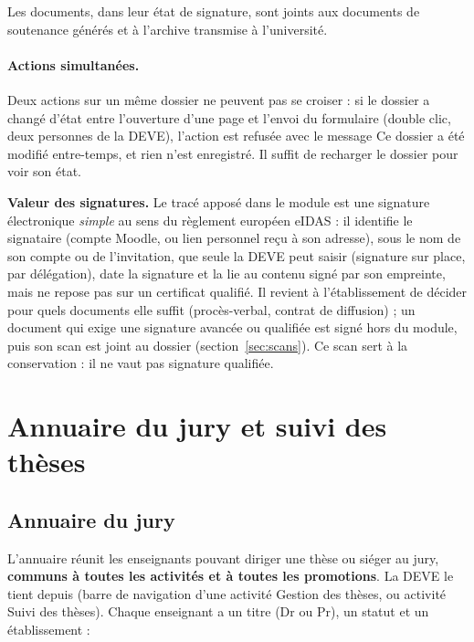 \documentclass[11pt,a4paper]{article}
\begin{document}

Les documents, dans leur état de signature, sont joints aux documents de
soutenance générés et à l'archive transmise à l'université.

\paragraph{Actions simultanées.} Deux actions sur un même dossier ne peuvent
pas se croiser : si le dossier a changé d'état entre l'ouverture d'une page et
l'envoi du formulaire (double clic, deux personnes de la DEVE), l'action est
refusée avec le message \og Ce dossier a été modifié entre-temps\fg{}, et
rien n'est enregistré. Il suffit de recharger le dossier pour voir son état.

\begin{attention}
\textbf{Valeur des signatures.} Le tracé apposé dans le module est une
signature électronique \emph{simple} au sens du règlement européen eIDAS : il
identifie le signataire (compte Moodle, ou lien personnel reçu à son adresse),
sous le nom de son compte ou de l'invitation, que seule la DEVE peut saisir
(signature sur place, par délégation),
date la signature et la lie au contenu signé par son empreinte, mais ne repose
pas sur un certificat qualifié. Il revient à l'établissement de décider pour
quels documents elle suffit (procès-verbal, contrat de diffusion) ; un document
qui exige une signature avancée ou qualifiée est signé hors du module, puis son
scan est joint au dossier (section~\ref{sec:scans}). Ce scan sert à la
conservation : il ne vaut pas signature qualifiée.
\end{attention}

\section{Annuaire du jury et suivi des thèses}

\subsection{Annuaire du jury}\label{sec:annuaire}

L'annuaire réunit les enseignants pouvant diriger une thèse ou siéger au jury,
\textbf{communs à toutes les activités et à toutes les promotions}. La DEVE le
tient depuis  (barre de navigation d'une activité
\og Gestion des thèses\fg{}, ou activité \og Suivi des thèses\fg{}). Chaque
enseignant a un titre (Dr ou Pr), un statut et un établissement :
\end{document}
